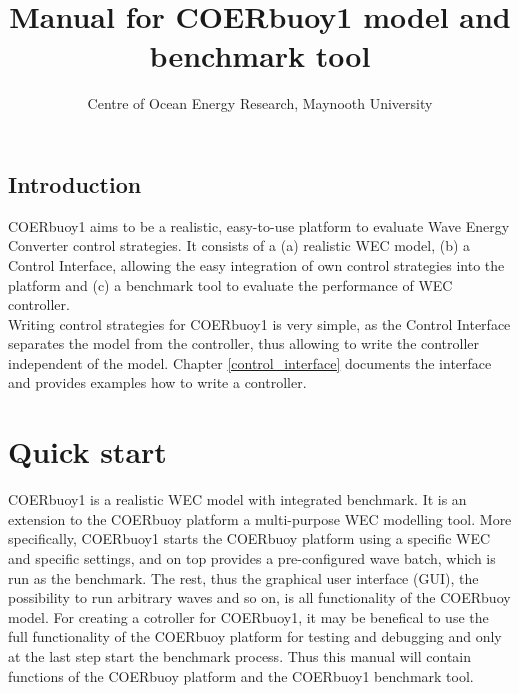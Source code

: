 \documentclass[oneside,10pt,a4paper]{book}
\title{Manual for COERbuoy1 model and benchmark tool}
\author{Centre of Ocean Energy Research, Maynooth University}
\begin{document}
\maketitle
\section*{Introduction}
COERbuoy1 aims to be a realistic, easy-to-use platform to evaluate Wave Energy Converter control strategies. It consists of a (a) realistic WEC model, (b) a Control Interface, allowing the easy integration of own control strategies into the platform and (c) a benchmark tool to evaluate the performance of WEC controller.\\
Writing control strategies for COERbuoy1 is very simple, as the Control Interface separates the model from the controller, thus allowing to write the controller independent of the model. Chapter \ref{control_interface} documents the interface and provides examples how to write a controller.%
\tableofcontents
\newpage
\chapter{Quick start}
COERbuoy1 is a realistic WEC model with integrated benchmark. It is an extension to the COERbuoy platform a multi-purpose WEC modelling tool. More specifically, COERbuoy1 starts the COERbuoy platform using a specific WEC and specific settings, and on top provides a pre-configured wave batch, which is run as the benchmark. The rest, thus the graphical user interface (GUI), the possibility to run arbitrary waves and so on, is all functionality of the COERbuoy model. For creating a cotroller for COERbuoy1, it may be benefical to use the full functionality of the COERbuoy platform for testing and debugging and only at the last step start the benchmark process. Thus this manual will contain functions of the COERbuoy platform and the COERbuoy1 benchmark tool.
\end{document}

